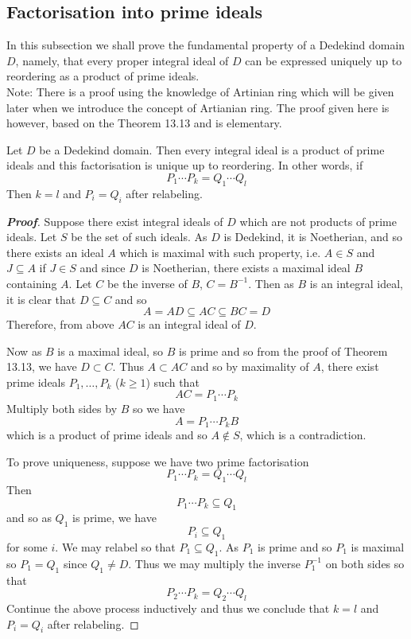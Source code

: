 \subsection{Factorisation into prime ideals}
In this subsection we shall prove the fundamental property of a Dedekind domain $D$, namely, that every proper
integral ideal of $D$ can be expressed uniquely up to reordering as a product of prime ideals.\\
Note: There is a proof using the knowledge of Artinian ring which will be given later when we introduce the concept of Artianian ring. The proof given here is however, based on the Theorem 13.13 and is elementary.
\begin{theorem} Let $D$ be a Dedekind domain. Then every integral ideal is a product of prime ideals and this factorisation is unique up to reordering. In other words, if
$$P_1\cdots P_k=Q_1 \cdots Q_l$$
Then $k=l$ and $P_i=Q_i$ after relabeling.
\end{theorem}
\begin{proof}[\bf Proof] Suppose there exist integral ideals of $D$ which are not products of prime ideals. Let $S$ be the set of such ideals. As $D$ is Dedekind, it is Noetherian, and so there exists an ideal $A$ which is maximal with such property, i.e. $A \in S$ and $J \subseteq A$ if $J \in S$ and since $D$ is Noetherian, there exists a maximal ideal $B$ containing $A$. Let $C$ be the inverse of $B$, $C=B^{-1}$. Then as $B$ is an integral ideal, it is clear that
$D \subseteq C$ and so
$$A=AD \subseteq AC \subseteq BC =D$$
Therefore, from above $AC$ is an integral ideal of $D$.

Now as $B$ is a maximal ideal, so $B$ is prime and so from the proof of Theorem 13.13, we have $D \subset C$.
Thus $A \subset AC$ and so by maximality of $A$, there exist prime ideals $P_1,\ldots,P_k$ ($k \ge 1$) such that
$$AC=P_1 \cdots P_k$$
Multiply both sides by $B$ so we have
$$A=P_1 \cdots P_k B$$ which is a product of prime ideals and so $A \not \in S$, which is a contradiction.

To prove uniqueness, suppose we have two prime factorisation
$$P_1 \cdots P_k = Q_1 \cdots Q_l$$
Then
$$P_1 \cdots P_k \subseteq Q_1$$
and so as $Q_1$ is prime, we have
$$P_i \subseteq Q_1$$ for some $i$. We may relabel so that $P_1 \subseteq Q_1$.
As $P_1$ is prime and so $P_1$ is maximal so $P_1=Q_1$ since $Q_1 \neq D$.
Thus we may multiply the inverse $P^{-1}_1$ on both sides so that
$$P_2 \cdots P_k=Q_2 \cdots Q_l$$
Continue the above process inductively and thus we conclude that $k=l$ and $P_i =Q_i$ after relabeling.
\end{proof}
